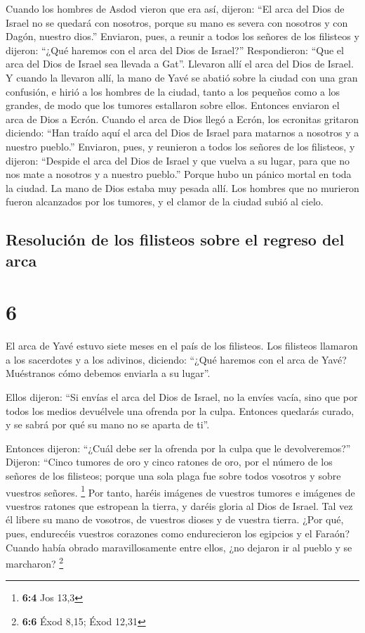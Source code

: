  Cuando los hombres de Asdod vieron que era así, dijeron:
``El arca del Dios de Israel no se quedará con nosotros, porque su mano
es severa con nosotros y con Dagón, nuestro dios.'' 
Enviaron, pues, a reunir a todos los señores de los filisteos y dijeron:
``¿Qué haremos con el arca del Dios de Israel?'' Respondieron: ``Que el
arca del Dios de Israel sea llevada a Gat''. Llevaron allí el arca del
Dios de Israel.  Y cuando la llevaron allí, la mano de
Yavé se abatió sobre la ciudad con una gran confusión, e hirió a los
hombres de la ciudad, tanto a los pequeños como a los grandes, de modo
que los tumores estallaron sobre ellos.  Entonces
enviaron el arca de Dios a Ecrón. Cuando el arca de Dios llegó a Ecrón,
los ecronitas gritaron diciendo: ``Han traído aquí el arca del Dios de
Israel para matarnos a nosotros y a nuestro pueblo.'' 
Enviaron, pues, y reunieron a todos los señores de los filisteos, y
dijeron: ``Despide el arca del Dios de Israel y que vuelva a su lugar,
para que no nos mate a nosotros y a nuestro pueblo.'' Porque hubo un
pánico mortal en toda la ciudad. La mano de Dios estaba muy pesada allí.
 Los hombres que no murieron fueron alcanzados por los
tumores, y el clamor de la ciudad subió al cielo.

\hypertarget{resoluciuxf3n-de-los-filisteos-sobre-el-regreso-del-arca}{%
\subsection{Resolución de los filisteos sobre el regreso del
arca}\label{resoluciuxf3n-de-los-filisteos-sobre-el-regreso-del-arca}}

\hypertarget{section-5}{%
\section{6}\label{section-5}}

 El arca de Yavé estuvo siete meses en el país de los
filisteos.  Los filisteos llamaron a los sacerdotes y a
los adivinos, diciendo: ``¿Qué haremos con el arca de Yavé? Muéstranos
cómo debemos enviarla a su lugar''.

 Ellos dijeron: ``Si envías el arca del Dios de Israel, no
la envíes vacía, sino que por todos los medios devuélvele una ofrenda
por la culpa. Entonces quedarás curado, y se sabrá por qué su mano no se
aparta de ti''.

 Entonces dijeron: ``¿Cuál debe ser la ofrenda por la
culpa que le devolveremos?'' Dijeron: ``Cinco tumores de oro y cinco
ratones de oro, por el número de los señores de los filisteos; porque
una sola plaga fue sobre todos vosotros y sobre vuestros señores.
\footnote{\textbf{6:4} Jos 13,3}  Por tanto, haréis
imágenes de vuestros tumores e imágenes de vuestros ratones que
estropean la tierra, y daréis gloria al Dios de Israel. Tal vez él
libere su mano de vosotros, de vuestros dioses y de vuestra tierra.
 ¿Por qué, pues, endurecéis vuestros corazones como
endurecieron los egipcios y el Faraón? Cuando había obrado
maravillosamente entre ellos, ¿no dejaron ir al pueblo y se marcharon?
\footnote{\textbf{6:6} Éxod 8,15; Éxod 12,31}

